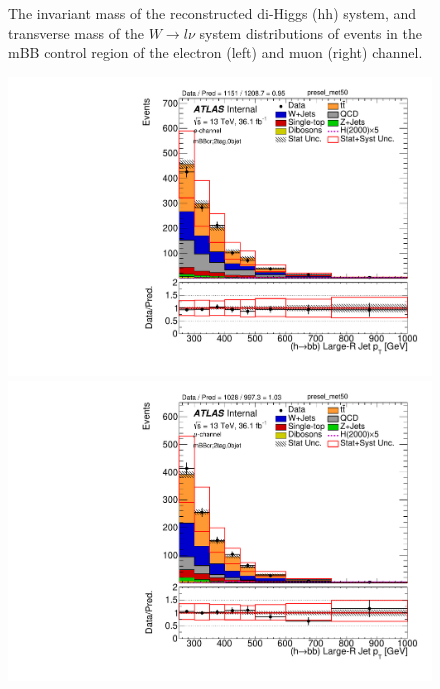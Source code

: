 \begin{figure}[!h]
\begin{center}
\caption{The invariant mass of the reconstructed di-Higgs (hh) system, \met and transverse mass of the $W \to l\nu$ system 
distributions of events in the mBB control region of the electron (left) and muon (right) channel.}
\label{fig:boosted_mbbcrleptons_mainplots}
\end{center}
\end{figure}

\begin{figure}[!h]
\begin{center}
\includegraphics[scale=0.33]{./figures/boosted/PlotByChannels/DataMC_2tag_0bjet_mbbcr_elec_presel_met50_HbbPt}                                                                                      
\includegraphics[scale=0.33]{./figures/boosted/PlotByChannels/DataMC_2tag_0bjet_mbbcr_muon_presel_met50_HbbPt}                                                                                      

\end{center}
\end{figure}
